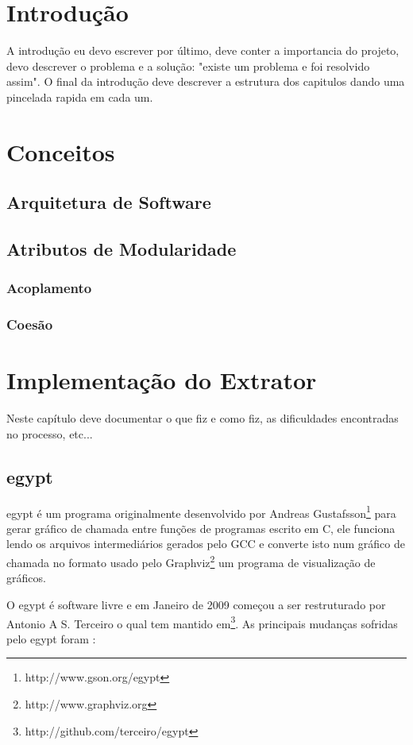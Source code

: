 \chapter{Introdução}

A introdução eu devo escrever por último, deve conter a importancia do projeto, devo descrever o problema e a solução: "existe um problema e foi resolvido assim". O final da introdução deve descrever a estrutura dos capitulos dando uma pincelada rapida em cada um.

\chapter{Conceitos}
\section{Arquitetura de Software}
\section{Atributos de Modularidade}
\subsection{Acoplamento}
\subsection{Coesão}

\chapter{Implementação do Extrator}

Neste capítulo deve documentar o que fiz e como fiz, as dificuldades encontradas no processo, etc...

\section{egypt}

egypt é um programa originalmente desenvolvido por Andreas Gustafsson\footnote{http://www.gson.org/egypt} para gerar gráfico de chamada entre funções de programas escrito em C, ele funciona lendo os arquivos intermediários gerados pelo GCC e converte isto num gráfico de chamada no formato usado pelo Graphviz\footnote{http://www.graphviz.org} um programa de visualização de gráficos.

O egypt é software livre e em Janeiro de 2009 começou a ser restruturado por Antonio A S. Terceiro o qual tem mantido em\footnote{http://github.com/terceiro/egypt}. As principais mudanças sofridas pelo egypt foram \cite{StructuralComplexityEvolution}:

